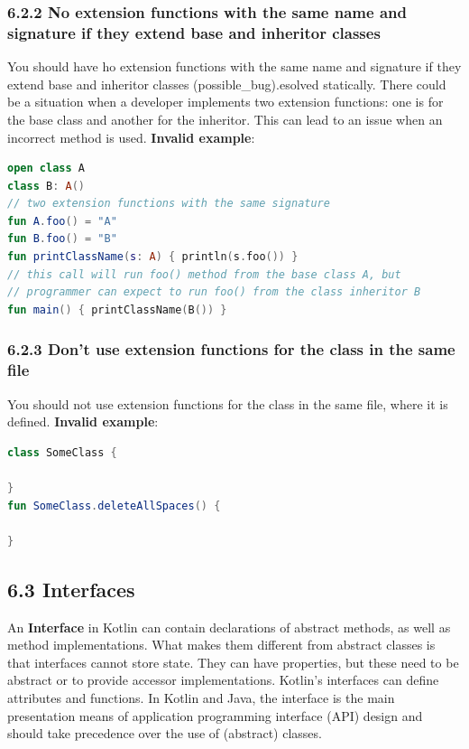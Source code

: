 \subsubsection*{\textbf{6.2.2 No extension functions with the same name and signature if they extend base and inheritor classes}}
\leavevmode\newline
\label{sec:6.2.2}
You should have ho extension functions with the same name and signature if they extend base and inheritor classes (possible\_bug).esolved statically. There could be a situation when a developer implements two extension functions: one is for the base class and another for the inheritor.
This can lead to an issue when an incorrect method is used.
\textbf{Invalid example}:
\begin{lstlisting}[language=Kotlin]
open class A
class B: A()
// two extension functions with the same signature
fun A.foo() = "A"
fun B.foo() = "B"
fun printClassName(s: A) { println(s.foo()) }
// this call will run foo() method from the base class A, but
// programmer can expect to run foo() from the class inheritor B
fun main() { printClassName(B()) }
\end{lstlisting}
\subsubsection*{\textbf{6.2.3 Don't use extension functions for the class in the same file}}
\leavevmode\newline
\label{sec:6.2.3}
You should not use extension functions for the class in the same file, where it is defined.
\textbf{Invalid example}:
\begin{lstlisting}[language=Kotlin]
class SomeClass {

}
fun SomeClass.deleteAllSpaces() {

}
\end{lstlisting}
\subsection*{\textbf{6.3 Interfaces}}
\label{sec:6.3}
An \textbf{Interface} in Kotlin can contain declarations of abstract methods, as well as method implementations. What makes them different from abstract classes is that interfaces cannot store state.
They can have properties, but these need to be abstract or to provide accessor implementations.
Kotlin's interfaces can define attributes and functions.
In Kotlin and Java, the interface is the main presentation means of application programming interface (API) design and should take precedence over the use of (abstract) classes.
